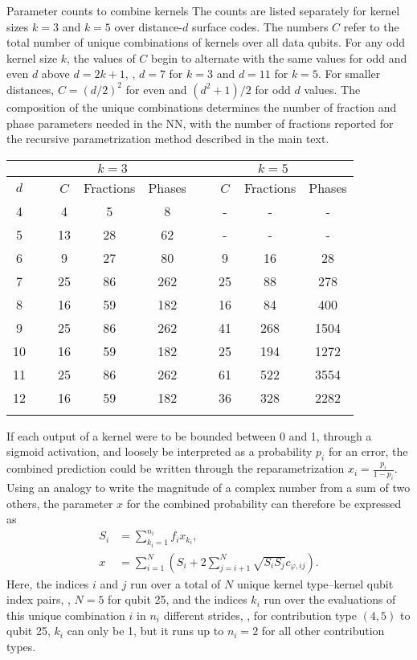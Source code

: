 \begin{table}[htbp]
\centering
\ccaption
{Parameter counts to combine kernels}
{
The counts are listed separately for kernel sizes $k=3$ and $k=5$ over distance-$d$ surface codes.
The numbers $C$ refer to the total number of unique combinations of kernels over all data qubits.
For any odd kernel size $k$, the values of $C$ begin to alternate with the same values for odd and even $d$ above $d=2k+1$, \ie, $d=7$ for $k=3$ and $d=11$ for $k=5$.
For smaller distances, $C=(d/2)^2$ for even and $(d^2+1)/2$ for odd $d$ values.
The composition of the unique combinations determines the number of fraction and phase parameters needed in the NN,
with the number of fractions reported for the recursive parametrization method described in the main text.
}
\renewcommand{\arraystretch}{1.25}
\begin{tabular}{c ccc ccc}
\hline
      & \multicolumn{3}{c}{$k=3$}   & \multicolumn{3}{c}{$k=5$} \\
\hline
$d$ & ~~~$C$ & Fractions & Phases & ~~~$C$ & Fractions & Phases \\
\hline
4 & ~~~4 & 5 & 8 & ~~~- & - & - \\
5 & ~~~13 & 28 & 62 & ~~~- & - & - \\
6 & ~~~9 & 27 & 80 & ~~~9 & 16 & 28 \\
7 & ~~~25 & 86 & 262 & ~~~25 & 88 & 278 \\
8 & ~~~16 & 59 & 182 & ~~~16 & 84 & 400 \\
9 & ~~~25 & 86 & 262 & ~~~41 & 268 & 1504 \\
10 & ~~~16 & 59 & 182 & ~~~25 & 194 & 1272 \\
11 & ~~~25 & 86 & 262 & ~~~61 & 522 & 3554 \\
12 & ~~~16 & 59 & 182 & ~~~36 & 328 & 2282 \\
\hline
\label{table:unique-kern-contribs}
\end{tabular}
\end{table}


If each output of a kernel were to be bounded between 0 and 1, through a sigmoid activation, and loosely be interpreted as a probability $p_i$ for an error, the combined prediction could be written through the reparametrization $x_i=\frac{p_i}{1-p_i}$. Using an analogy to write the magnitude of a complex number from a sum of two others, the parameter $x$ for the combined probability can therefore be expressed as
\begin{equation}
\begin{aligned}
S_i &= \sum_{k_i=1}^{n_i} f_i x_{k_i}, \\
x &= \sum_{i=1}^{N} \left( S_i + 2 \sum_{j=i+1}^{N} \sqrt{S_i S_j} c_{\varphi, ij} \right).
\end{aligned}
\label{eq:kernsum}
\end{equation}
Here, the indices $i$ and $j$ run over a total of $N$ unique kernel type--kernel qubit index pairs, \eg, $N=5$ for qubit 25, and the indices $k_i$ run over the evaluations of this unique combination $i$ in $n_i$ different strides, \eg, for contribution type $(4,5)$ to qubit 25, $k_i$ can only be 1, but it runs up to $n_i=2$ for all other contribution types.

